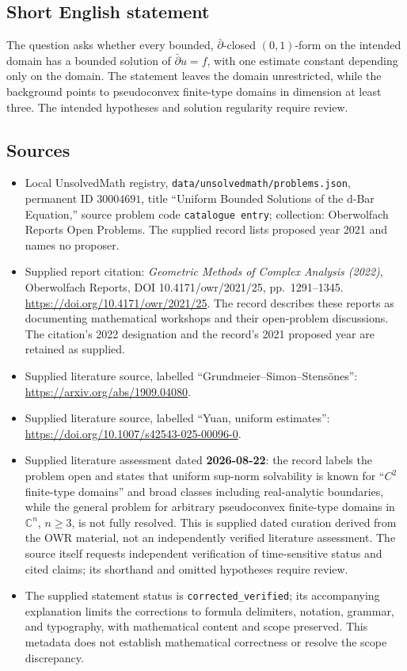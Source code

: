 \documentclass[11pt]{article}
\newcommand{\C}{\mathbb{C}}
\begin{document}
\subsection{Short English statement}
The question asks whether every bounded, \(\bar\partial\)-closed \((0,1)\)-form on the intended domain has a bounded solution of \(\bar\partial u=f\), with one estimate constant depending only on the domain. The statement leaves the domain unrestricted, while the background points to pseudoconvex finite-type domains in dimension at least three. The intended hypotheses and solution regularity require review.
\subsection{Sources}
\begin{itemize}
\item Local UnsolvedMath registry, \texttt{data/unsolvedmath/problems.json}, permanent ID \(30004691\), title ``Uniform Bounded Solutions of the d-Bar Equation,'' source problem code \texttt{catalogue entry}; collection: Oberwolfach Reports Open Problems. The supplied record lists proposed year 2021 and names no proposer.
\item Supplied report citation: \emph{Geometric Methods of Complex Analysis (2022)}, Oberwolfach Reports, DOI 10.4171/owr/2021/25, pp.\ 1291--1345. \url{https://doi.org/10.4171/owr/2021/25}. The record describes these reports as documenting mathematical workshops and their open-problem discussions. The citation's 2022 designation and the record's 2021 proposed year are retained as supplied.
\item Supplied literature source, labelled ``Grundmeier--Simon--Stens\"ones'': \url{https://arxiv.org/abs/1909.04080}.
\item Supplied literature source, labelled ``Yuan, uniform estimates'': \url{https://doi.org/10.1007/s42543-025-00096-0}.
\item Supplied literature assessment dated \textbf{2026-08-22}: the record labels the problem open and states that uniform sup-norm solvability is known for ``\(C^2\) finite-type domains'' and broad classes including real-analytic boundaries, while the general problem for arbitrary pseudoconvex finite-type domains in \(\C^n\), \(n\geq3\), is not fully resolved. This is supplied dated curation derived from the OWR material, not an independently verified literature assessment. The source itself requests independent verification of time-sensitive status and cited claims; its shorthand and omitted hypotheses require review.
\item The supplied statement status is \texttt{corrected\_verified}; its accompanying explanation limits the corrections to formula delimiters, notation, grammar, and typography, with mathematical content and scope preserved. This metadata does not establish mathematical correctness or resolve the scope discrepancy.
\end{itemize}
\end{document}

